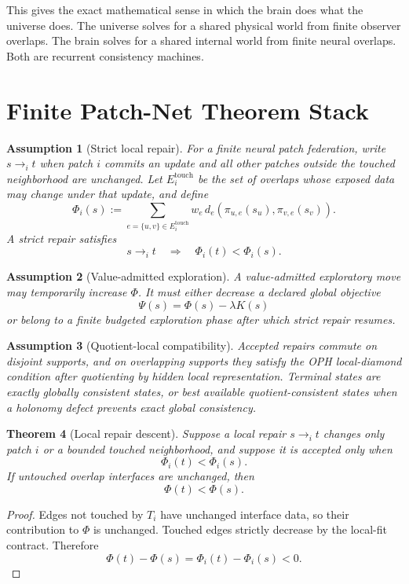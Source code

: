 \documentclass[11pt]{article}
\newtheorem{theorem}{Theorem}[section]
\newtheorem{assumption}[theorem]{Assumption}
\theoremstyle{remark}
\theoremstyle{plain}
\begin{document}
This gives the exact mathematical sense in which the brain does what the universe does. The universe solves for a shared physical world from finite observer overlaps. The brain solves for a shared internal world from finite neural overlaps. Both are recurrent consistency machines.

\section{Finite Patch-Net Theorem Stack}

\begin{assumption}[Strict local repair]
For a finite neural patch federation, write \(s\to_i t\) when patch \(i\) commits an update and all other patches outside the touched neighborhood are unchanged. Let \(E_i^{\mathrm{touch}}\) be the set of overlaps whose exposed data may change under that update, and define
\[
\Phi_i(s):=
\sum_{e=\{u,v\}\in E_i^{\mathrm{touch}}}
w_e\,d_e\!\left(\pi_{u,e}(s_u),\pi_{v,e}(s_v)\right).
\]
A strict repair satisfies
\[
s\to_i t
\quad\Longrightarrow\quad
\Phi_i(t)<\Phi_i(s).
\]
\end{assumption}

\begin{assumption}[Value-admitted exploration]
A value-admitted exploratory move may temporarily increase \(\Phi\). It must either decrease a declared global objective
\[
\Psi(s)=\Phi(s)-\lambda K(s)
\]
or belong to a finite budgeted exploration phase after which strict repair resumes.
\end{assumption}

\begin{assumption}[Quotient-local compatibility]
Accepted repairs commute on disjoint supports, and on overlapping supports they satisfy the OPH local-diamond condition after quotienting by hidden local representation. Terminal states are exactly globally consistent states, or best available quotient-consistent states when a holonomy defect prevents exact global consistency.
\end{assumption}

\begin{theorem}[Local repair descent]
Suppose a local repair \(s\to_i t\) changes only patch \(i\) or a bounded touched neighborhood, and suppose it is accepted only when
\[
\Phi_i(t)<\Phi_i(s).
\]
If untouched overlap interfaces are unchanged, then
\[
\Phi(t)<\Phi(s).
\]
\end{theorem}

\begin{proof}
Edges not touched by \(T_i\) have unchanged interface data, so their contribution to \(\Phi\) is unchanged. Touched edges strictly decrease by the local-fit contract. Therefore
\[
\Phi(t)-\Phi(s)=\Phi_i(t)-\Phi_i(s)<0.
\]
\end{proof}
\end{document}
